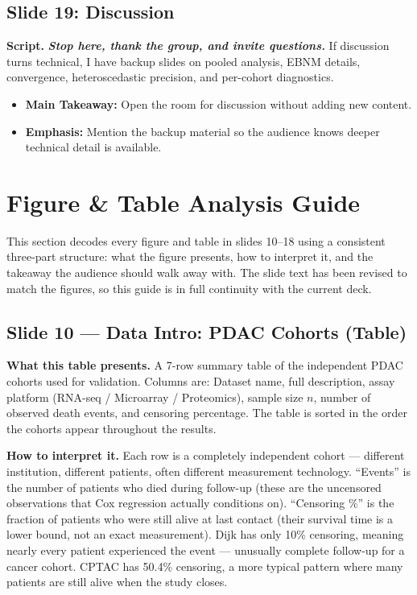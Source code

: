 \documentclass[11pt]{article}
\newcommand{\scriptlabel}{\textbf{Script. }}
\newcommand{\sectionlabel}[1]{\textbf{#1}}
\newcommand{\actioncue}[1]{\textit{\textbf{#1}}}
\begin{document}
\subsection*{Slide 19: Discussion}
\scriptlabel \actioncue{Stop here, thank the group, and invite questions.} If discussion turns technical, I have backup slides on pooled analysis, EBNM details, convergence, heteroscedastic precision, and per-cohort diagnostics.

\begin{itemize}
\item \sectionlabel{Main Takeaway:} Open the room for discussion without adding new content.
\item \sectionlabel{Emphasis:} Mention the backup material so the audience knows deeper technical detail is available.
\end{itemize}

\section*{Figure \& Table Analysis Guide}

\noindent This section decodes every figure and table in slides 10--18 using a consistent three-part structure: what the figure presents, how to interpret it, and the takeaway the audience should walk away with. The slide text has been revised to match the figures, so this guide is in full continuity with the current deck.

\subsection*{Slide 10 --- Data Intro: PDAC Cohorts (Table)}

\textbf{What this table presents.} A 7-row summary table of the independent PDAC cohorts used for validation. Columns are: Dataset name, full description, assay platform (RNA-seq / Microarray / Proteomics), sample size $n$, number of observed death events, and censoring percentage. The table is sorted in the order the cohorts appear throughout the results.

\textbf{How to interpret it.} Each row is a completely independent cohort --- different institution, different patients, often different measurement technology. ``Events'' is the number of patients who died during follow-up (these are the uncensored observations that Cox regression actually conditions on). ``Censoring \%'' is the fraction of patients who were still alive at last contact (their survival time is a lower bound, not an exact measurement). Dijk has only 10\% censoring, meaning nearly every patient experienced the event --- unusually complete follow-up for a cancer cohort. CPTAC has 50.4\% censoring, a more typical pattern where many patients are still alive when the study closes.
\end{document}

